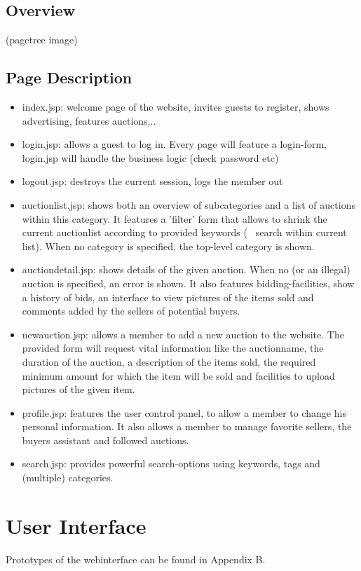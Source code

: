 \documentclass[a4paper, 12pt]{report}
\begin{document}
\subsection{Overview}
(pagetree image)

\subsection{Page Description}
\begin{itemize}
\item index.jsp: welcome page of the website, invites guests to register, shows advertising, features auctions,..
\item login.jsp: allows a guest to log in. Every page will feature a login-form, login.jsp will handle the business logic (check password etc)
\item logout.jsp: destroys the current session, logs the member out
\item auctionlist.jsp: shows both an overview of subcategories and a list of auctions within this category. It features a 'filter' form that allows to shrink the current auctionlist according to provided keywords (~ search within current list). When no category is specified, the top-level category is shown.
\item auctiondetail.jsp: shows details of the given auction. When no (or an illegal) auction is specified, an error is shown. It also features bidding-facilities, show a history of bids, an interface to view pictures of the items sold and comments added by the sellers of potential buyers.
\item newauction.jsp: allows a member to add a new auction to the website. The provided form will request vital information like the auctionname, the duration of the auction, a description of the items sold, the required minimum amount for which the item will be sold and facilities to upload pictures of the given item.
\item profile.jsp: features the user control panel, to allow a member to change his personal information. It also allows a member to manage favorite sellers, the buyers assistant and followed auctions.
\item search.jsp: provides powerful search-options using keywords, tags and (multiple) categories.
\end{itemize}
\pagebreak
\section{User Interface}
Prototypes of the webinterface can be found in Appendix B.
\end{document}

